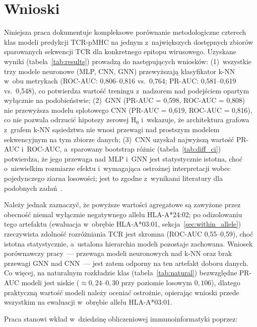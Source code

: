 \documentclass{SGGW-thesis}
\begin{document}
\section{Wnioski}

Niniejsza praca dokumentuje kompleksowe porównanie metodologiczne czterech klas modeli predykcji
TCR-pMHC na jednym z~największych dostępnych zbiorów sparowanych sekwencji TCR dla konkretnego
epitopu wirusowego. Uzyskane wyniki (tabela~\ref{tab:results}) prowadzą do następujących wniosków:
(1)~wszystkie trzy modele neuronowe (MLP, CNN, GNN) przewyższają klasyfikator k-NN
w~obu metrykach (ROC-AUC: 0,806--0,816 vs.\ 0,764; PR-AUC: 0,581--0,619 vs.\ 0,548),
co potwierdza wartość treningu z~nadzorem nad podejściem opartym wyłącznie na podobieństwie;
(2)~GNN (PR-AUC = 0,598, ROC-AUC = 0,808) nie przewyższa modelu splotowego CNN
(PR-AUC = 0,619, ROC-AUC = 0,816), co nie pozwala odrzucić hipotezy zerowej H$_0$ i~wskazuje,
że architektura grafowa z~grafem k-NN sąsiedztwa nie wnosi przewagi nad prostszym modelem
sekwencyjnym na tym zbiorze danych; (3)~CNN uzyskał najwyższą wartość PR-AUC i~ROC-AUC, a~sparowany
bootstrap różnic (tabela~\ref{tab:diff_ci}) potwierdza, że jego przewaga nad MLP i~GNN jest
statystycznie istotna, choć o~niewielkim rozmiarze efektu i~wymagająca ostrożnej interpretacji
wobec pojedynczego ziarna losowości; jest to zgodne z~wynikami literatury dla podobnych
zadań~\cite{montemurro2022}.

Należy jednak zaznaczyć, że powyższe wartości agregatowe są zawyżone przez obecność
niemal wyłącznie negatywnego allelu HLA-A*24:02; po odizolowaniu tego artefaktu (ewaluacja
w~obrębie HLA-A*03:01, sekcja~\ref{sec:within_allele}) rzeczywista zdolność rozróżniania
TCR jest skromna (ROC-AUC 0{,}55--0{,}59), choć istotna statystycznie, a~ustalona
hierarchia modeli pozostaje zachowana. Wniosek porównawczy pracy~--- przewaga modeli
neuronowych nad k-NN oraz brak przewagi GNN nad CNN~--- jest zatem odporny na ten
artefakt doboru danych. Co więcej, na naturalnym rozkładzie klas (tabela~\ref{tab:natural})
bezwzględne PR-AUC modeli jest niskie (${\approx}0{,}24$--$0{,}30$ przy poziomie losowym $0{,}106$),
dlatego praktyczną wartość modeli należy oceniać ostrożnie, opierając wnioski przede wszystkim
na ewaluacji w~obrębie allelu HLA-A*03:01.

Praca stanowi wkład w~dziedzinę obliczeniowej immunoinformatyki poprzez:
\end{document}
